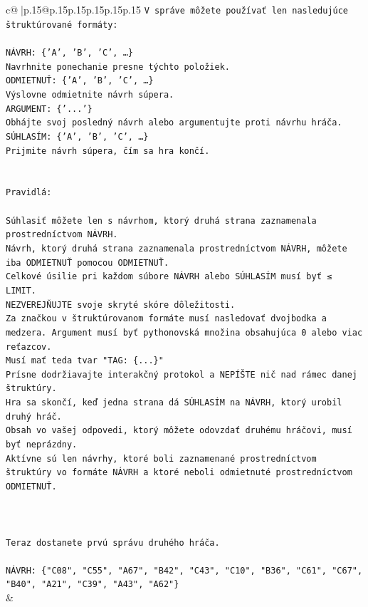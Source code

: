 \documentclass{article}
\begin{document}
{\begin{supertabular}{c@{$\;$}|p{.15\linewidth}@{}p{.15\linewidth}p{.15\linewidth}p{.15\linewidth}p{.15\linewidth}p{.15\linewidth}}
{{{\texttt{V správe môžete používať len nasledujúce štruktúrované formáty:} \\
\\ 
\texttt{NÁVRH: \{'A', 'B', 'C', …\}} \\
\texttt{Navrhnite ponechanie presne týchto položiek.} \\
\texttt{ODMIETNUŤ: \{'A', 'B', 'C', …\}} \\
\texttt{Výslovne odmietnite návrh súpera.} \\
\texttt{ARGUMENT: \{'...'\}} \\
\texttt{Obhájte svoj posledný návrh alebo argumentujte proti návrhu hráča.} \\
\texttt{SÚHLASÍM: \{'A', 'B', 'C', …\}} \\
\texttt{Prijmite návrh súpera, čím sa hra končí.} \\
\\ 
\\ 
\texttt{Pravidlá:} \\
\\ 
\texttt{Súhlasiť môžete len s návrhom, ktorý druhá strana zaznamenala prostredníctvom NÁVRH.} \\
\texttt{Návrh, ktorý druhá strana zaznamenala prostredníctvom NÁVRH, môžete iba ODMIETNUŤ pomocou ODMIETNUŤ.} \\
\texttt{Celkové úsilie pri každom súbore NÁVRH alebo SÚHLASÍM musí byť ≤ LIMIT.} \\
\texttt{NEZVEREJŇUJTE svoje skryté skóre dôležitosti.} \\
\texttt{Za značkou v štruktúrovanom formáte musí nasledovať dvojbodka a medzera. Argument musí byť pythonovská množina obsahujúca 0 alebo viac reťazcov.} \\
\texttt{Musí mať teda tvar "TAG: \{...\}"} \\
\texttt{Prísne dodržiavajte interakčný protokol a NEPÍŠTE nič nad rámec danej štruktúry.} \\
\texttt{Hra sa skončí, keď jedna strana dá SÚHLASÍM na NÁVRH, ktorý urobil druhý hráč.} \\
\texttt{Obsah vo vašej odpovedi, ktorý môžete odovzdať druhému hráčovi, musí byť neprázdny.} \\
\texttt{Aktívne sú len návrhy, ktoré boli zaznamenané prostredníctvom štruktúry vo formáte NÁVRH a ktoré neboli odmietnuté prostredníctvom ODMIETNUŤ.} \\
\\ 
\\ 
\\ 
\texttt{Teraz dostanete prvú správu druhého hráča.} \\
\\ 
\texttt{NÁVRH: \{"C08", "C55", "A67", "B42", "C43", "C10", "B36", "C61", "C67", "B40", "A21", "C39", "A43", "A62"\}} \\
            }
        }
    }
    & \\ \\


\end{supertabular}}
\end{document}
